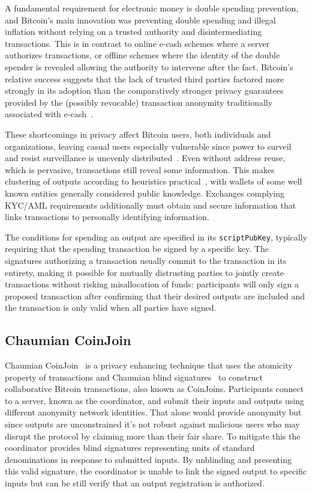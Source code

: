 \documentclass[a4paper]{article}
\begin{document}
A fundamental requirement for electronic money is double spending prevention, and Bitcoin's main innovation was preventing double spending and illegal inflation without relying on a trusted authority and disintermediating transactions. This is in contrast to online e-cash schemes where a server authorizes transactions, or offline schemes where the identity of the double spender is revealed allowing the authority to intervene after the fact. Bitcoin's relative success suggests that the lack of trusted third parties factored more strongly in its adoption than the comparatively stronger privacy guarantees provided by the (possibly revocable) transaction  anonymity traditionally associated with e-cash~\cite{davida1997anonymity}.

These shortcomings in privacy affect Bitcoin users, both individuals and organizations, leaving casual users especially vulnerable since power to surveil and resist surveillance is unevenly distributed~\cite{rogaway2015moral}. Even without address reuse, which is pervasive, transactions still reveal some information. This makes clustering of outputs according to heuristics practical~\cite{harrigan2016unreasonable}, with wallets of some well known entities generally considered public knowledge. Exchanges complying KYC/AML requirements additionally must obtain and secure information that links transactions to personally identifying information.

The conditions for spending an output are specified in its \texttt{scriptPubKey}, typically requiring that the spending transaction be signed by a specific key. The signatures authorizing a transaction usually commit to the transaction in its entirety, making it possible for mutually distrusting parties to jointly create transactions without risking misallocation of funds: participants will only sign a proposed transaction after confirming that their desired outputs are included and the transaction is only valid when all parties have signed.

\subsection{Chaumian CoinJoin}

Chaumian CoinJoin~\cite{mizrahi2013blind,maxwell2013coinjoin,zerolink} is a privacy enhancing technique that uses the atomicity property of transactions and Chaumian blind signatures~\cite{chaum1983blind} to construct collaborative Bitcoin transactions, also known as CoinJoins. Participants connect to a server, known as the coordinator, and submit their inputs and outputs using different anonymity network identities. That alone would provide anonymity but since outputs are unconstrained it's not robust against malicious users who may disrupt the protocol by claiming more than their fair share. To mitigate this the coordinator provides blind signatures representing units of standard denominations in response to submitted inputs. By unblinding and presenting this valid signature, the coordinator is unable to link the signed output to specific inputs but can be still verify that an output registration is authorized.
\end{document}
